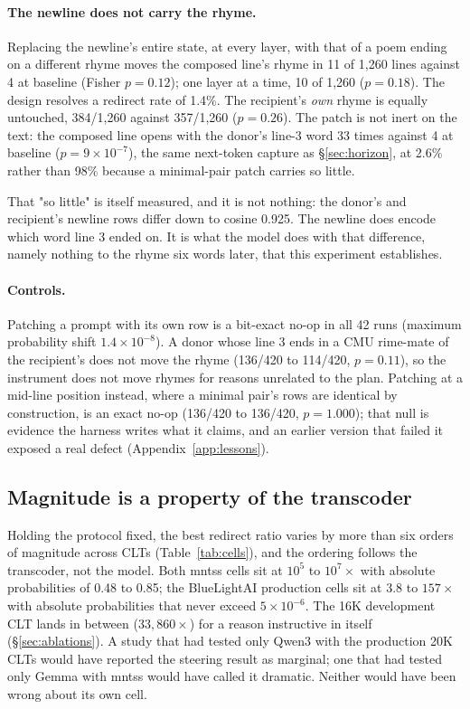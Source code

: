 \documentclass[11pt]{article}
\begin{document}
\paragraph{The newline does not carry the rhyme.}
Replacing the newline's entire state, at every layer, with that of a poem ending
on a different rhyme moves the composed line's rhyme in 11 of 1{,}260 lines against
4 at baseline (Fisher $p=0.12$); one layer at a time, 10 of 1{,}260 ($p=0.18$).
The design resolves a redirect rate of 1.4\%. The recipient's \emph{own} rhyme is
equally untouched, 384/1{,}260 against 357/1{,}260 ($p=0.26$). The patch is not
inert on the text: the composed line opens with the donor's line-3 word 33 times
against 4 at baseline ($p=9\times10^{-7}$), the same next-token capture as
\S\ref{sec:horizon}, at 2.6\% rather than 98\% because a minimal-pair patch
carries so little.

That "so little" is itself measured, and it is not nothing: the donor's and
recipient's newline rows differ down to cosine 0.925. The newline does encode
which word line 3 ended on. It is what the model does with that difference,
namely nothing to the rhyme six words later, that this experiment establishes.

\paragraph{Controls.}
Patching a prompt with its own row is a bit-exact no-op in all 42 runs (maximum
probability shift $1.4\times10^{-8}$). A donor whose line 3 ends in a CMU
rime-mate of the recipient's does not move the rhyme (136/420 to 114/420,
$p=0.11$), so the instrument does not move rhymes for reasons unrelated to the
plan. Patching at a mid-line position instead, where a minimal pair's rows are
identical by construction, is an exact no-op (136/420 to 136/420, $p=1.000$);
that null is evidence the harness writes what it claims, and an earlier version
that failed it exposed a real defect (Appendix~\ref{app:lessons}).

\subsection{Magnitude is a property of the transcoder}
\label{sec:magnitude}

Holding the protocol fixed, the best redirect ratio varies by more than six orders of magnitude across CLTs (Table~\ref{tab:cells}), and the ordering follows the transcoder, not the model. Both mntss cells sit at $10^{5}$ to $10^{7}\times$ with absolute probabilities of 0.48 to 0.85; the BlueLightAI production cells sit at $3.8$ to $157\times$ with absolute probabilities that never exceed $5\times10^{-6}$. The 16K development CLT lands in between ($33{,}860\times$) for a reason instructive in itself (\S\ref{sec:ablations}). A study that had tested only Qwen3 with the production 20K CLTs would have reported the steering result as marginal; one that had tested only Gemma with mntss would have called it dramatic. Neither would have been wrong about its own cell.
\end{document}
